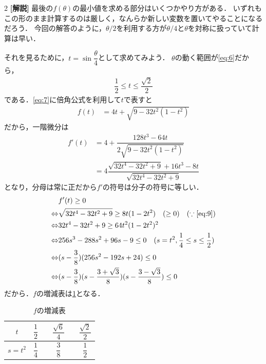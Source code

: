 \documentclass[../../main.tex]{subfiles}
\begin{document}
\begin{multicols}{2}
  {\bf [解説]}
  最後の$f(\theta)$の最小値を求める部分はいくつかやり方がある．
  いずれもこの形のまま計算するのは厳しく，なんらか新しい変数を置いてやることになるだろう．
  今回の解答のように，$\theta/2$を利用する方が$\theta/4$と$\theta$を対称に扱っていて計算は早い．

  それを見るために，$t=\sin\dfrac{\theta}{4}$として求めてみよう．
  $\theta$の動く範囲が\cref{eq:6}だから，
  \begin{align}
    \dfrac{1}{2} \le t \le \dfrac{\sqrt{2}}{2} \label{eq:9}
  \end{align}
  である．\cref{eq:7}に倍角公式を利用して$t$で表すと
  \begin{align}
    f(t) & = 4t + \sqrt{9-32t^2(1-t^2)}
  \end{align}
  だから，一階微分は
  \begin{align}
    f'(t)
    & = 4 + \dfrac{128t^3 - 64t}{2\sqrt{9-32t^2(1-t^2)}}              \\
    & = 4 \dfrac{\sqrt{32t^4-32t^2+9}+16t^3-8t}{\sqrt{32t^4-32t^2+9}}
  \end{align}
  となり，分母は常に正だから$f'$の符号は分子の符号に等しい．
  \begin{align}
    & f'(t) \ge 0                                                                                   \\
    \Leftrightarrow & \sqrt{32t^4-32t^2+9} \ge 8t(1-2t^2) \quad (\ge 0) \quad (\because \text{\cref{eq:9}}) \\
    \Leftrightarrow & 32t^4-32t^2+9 \ge 64t^2(1-2t^2)^2                                                             \\
    \Leftrightarrow & 256s^3-288s^2+96s-9 \le 0 \quad (s=t^2, \dfrac{1}{4} \le s \le \dfrac{1}{2})                    \\
    \Leftrightarrow & (s-\dfrac{3}{8})(256s^2-192s+24) \le 0                                                         \\
    \Leftrightarrow & (s-\dfrac{3}{8})(s-\dfrac{3+\sqrt{3}}{8})(s-\dfrac{3-\sqrt{3}}{8}) \le 0
  \end{align}
  だから．$f$の増減表は\cref{2002-2:table:2}となる．
  \begin{table}[H]
    \centering
    \caption{$f$の増減表}
    \label{2002-2:table:2}
    \begin{tabular}{|c||c|c|c|c|c|}
      \hline
      $t$     & $\dfrac{1}{2}$ &            & $\dfrac{\sqrt{6}}{4}$ &            & $\dfrac{\sqrt{2}}{2}$ \\
      \hline
      $s=t^2$ & $\dfrac{1}{4}$ &            & $\dfrac{3}{8}$        &            & $\dfrac{1}{2}$        \\

\end{tabular}
\end{table}
\end{multicols}
\end{document}
